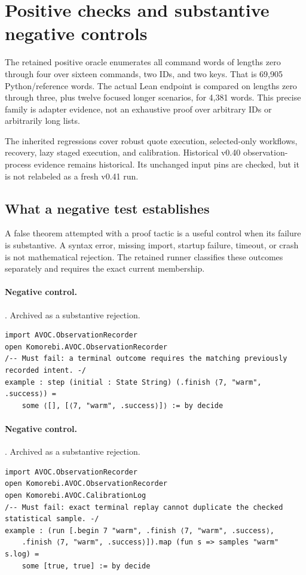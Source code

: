 \documentclass[11pt]{article}
\begin{document}
\section{Positive checks and substantive negative controls}
The retained positive oracle enumerates all command words of lengths zero
through four over sixteen commands, two IDs, and two keys. That is 69,905
Python/reference words. The actual Lean endpoint is compared on lengths zero
through three, plus twelve focused longer scenarios, for 4,381 words. This
precise family is adapter evidence, not an exhaustive proof over arbitrary
IDs or arbitrarily long lists.

The inherited regressions cover robust quote execution, selected-only
workflows, recovery, lazy staged execution, and calibration. Historical v0.40
observation-process evidence remains historical. Its unchanged input pins are
checked, but it is not relabeled as a fresh v0.41 run.

\subsection{What a negative test establishes}
A false theorem attempted with a proof tactic is a useful control when its
failure is substantive. A syntax error, missing import, startup failure,
timeout, or crash is not mathematical rejection. The retained runner classifies
these outcomes separately and requires the exact current membership.

\paragraph{Negative control.}. Archived as a substantive rejection.
\begin{lstlisting}[style=AVOCSource]
import AVOC.ObservationRecorder
open Komorebi.AVOC.ObservationRecorder
/-- Must fail: a terminal outcome requires the matching previously recorded intent. -/
example : step (initial : State String) (.finish ⟨7, "warm", .success⟩) =
    some ⟨[], [⟨7, "warm", .success⟩]⟩ := by decide
\end{lstlisting}

\paragraph{Negative control.}. Archived as a substantive rejection.
\begin{lstlisting}[style=AVOCSource]
import AVOC.ObservationRecorder
open Komorebi.AVOC.ObservationRecorder
open Komorebi.AVOC.CalibrationLog
/-- Must fail: exact terminal replay cannot duplicate the checked statistical sample. -/
example : (run [.begin 7 "warm", .finish ⟨7, "warm", .success⟩,
    .finish ⟨7, "warm", .success⟩]).map (fun s => samples "warm" s.log) =
    some [true, true] := by decide
\end{lstlisting}
\end{document}
